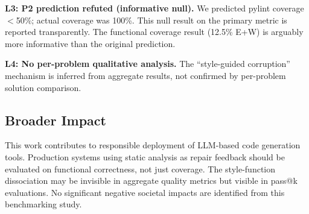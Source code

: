 \textbf{L3: P2 prediction refuted (informative null).} We predicted pylint coverage $<$50\%; actual coverage was 100\%. This null result on the primary metric is reported transparently. The functional coverage result (12.5\% E+W) is arguably more informative than the original prediction.

\textbf{L4: No per-problem qualitative analysis.} The ``style-guided corruption'' mechanism is inferred from aggregate results, not confirmed by per-problem solution comparison.

\subsection{Broader Impact}

This work contributes to responsible deployment of LLM-based code generation tools. Production systems using static analysis as repair feedback should be evaluated on functional correctness, not just coverage. The style-function dissociation may be invisible in aggregate quality metrics but visible in pass@k evaluations. No significant negative societal impacts are identified from this benchmarking study.
